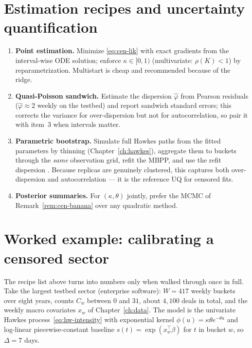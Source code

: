 \section{Estimation recipes and uncertainty quantification}
\label{sec:cen-uq}

\begin{enumerate}
\item \textbf{Point estimation.} Minimize \eqref{eq:cen-lik} with exact gradients from the
interval-wise ODE solution; enforce $\kappa \in [0,1)$ (multivariate: $\rho(K)<1$) by
reparametrization. Multistart is cheap and recommended because of the ridge.
\item \textbf{Quasi-Poisson sandwich.} Estimate the dispersion $\hat\varphi$ from Pearson
residuals ($\hat\varphi \approx 2$ weekly on the testbed) and report sandwich standard
errors; this corrects the variance for over-dispersion but not for autocorrelation,
so pair it with item~3 when intervals matter.
\item \textbf{Parametric bootstrap.} Simulate full Hawkes paths from the fitted
parameters by thinning (Chapter~\ref{ch:hawkes}), aggregate them to buckets through the
\emph{same} observation grid, refit the MBPP, and use the refit dispersion
\cite{efron1994}. Because replicas are genuinely clustered, this captures both
over-dispersion and autocorrelation --- it is the reference UQ for censored fits.
\item \textbf{Posterior summaries.} For $(\kappa,\theta)$ jointly, prefer the MCMC of
Remark~\ref{rem:cen-banana} over any quadratic method.
\end{enumerate}

\section{Worked example: calibrating a censored sector}
\label{sec:cen-worked}

The recipe list above turns into numbers only when walked through once in full. Take the
largest testbed sector (enterprise software): $W = 417$ weekly buckets over eight years,
counts $C_w$ between $0$ and $31$, about $4{,}100$ deals in total, and the weekly macro
covariates $x_w$ of Chapter~\ref{ch:data}. The model is the univariate Hawkes
process~\eqref{eq:hw-intensity} with exponential kernel
$\phi(u) = \kappa\theta e^{-\theta u}$ and log-linear piecewise-constant baseline
$s(t) = \exp(x_w^\top \beta)$ for $t$ in bucket $w$, so $\Delta = 7$ days.

